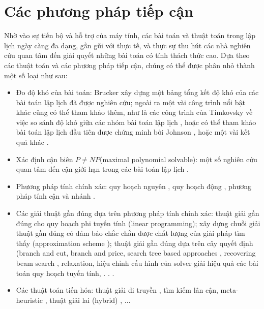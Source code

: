 \documentclass[11pt]{article}
\begin{document}
\section{\texorpdfstring{Các phương pháp tiếp cận}{Approaches}}

Nhờ vào sự tiến bộ và hỗ trợ của máy tính, các bài toán và thuật toán trong lập lịch ngày càng đa dạng, gần gũi với thực tế, và thực sự thu hút các nhà nghiên cứu quan tâm đến giải quyết những bài toán có tính thách thức cao.
Dựa theo các thuật toán và các phương pháp tiếp cận, chúng có thể được phân nhỏ thành một số loại như sau:

\begin{itemize}
\item Đo độ khó của bài toán: Brucker \cite{Brucker:2004,Brucker:Knust:2004} xây dựng một bảng tổng kết độ khó của các bài toán lập lịch đã được nghiên cứu; ngoài ra một vài công trình nổi bật khác cũng có thể tham khảo thêm, như là các công trình của Timkovsky về việc so sánh độ khó giữa các nhóm bài toán lập lịch \cite{Timkovsky:1998,Timkovsky:2003}, hoặc có thể tham khảo bài toán lập lịch đầu tiên được chứng minh bởi Johnson \cite{Johnson:1954}, hoặc một vài kết quả khác \cite{Haned:al:2012, Soukhal:al:2005}.

\item Xác định cận biên $P \neq NP$(maximal polynomial solvable): một số nghiên cứu quan tâm đến cận giới hạn trong các bài toán lập lịch  \cite{Baptiste:2000, Baptiste:al:2004, Baptiste:al:2007, Brucker:2004, HuynhTuong:Soukhal:2008}.

\item Phương pháp tính chính xác: quy hoạch nguyên \cite{Baptiste:Sadykov:2010, LeThi:Pham:2008}, quy hoạch động \cite{HuynhTuong:al:2010, Lawler:1969, Lawler:1990}, phương pháp tính cận và nhánh \cite{BellenguezMorineau:Neron:2007, Carlier:1982, Woeginger:2008}.

\item Các giải thuật gần đúng dựa trên phương pháp tính chính xác: thuật giải gần đúng cho quy hoạch phi tuyến tính (linear programming)\cite{Hoang:2009a, Hoang:2009b, LeThi:Pham:2008}; xây dựng chuỗi giải thuật gần đúng có đảm bảo chắc chắn được chất lượng của giải pháp tìm thấy (approximation scheme \cite{Afrati:Milis:2006, Kellerer:Strusevich:2006, Kolliopoulos:Steiner:2006, Kovalyov:1995}); thuật giải gần đúng dựa trên cây quyết định (branch and cut, branch and price, search tree based approaches \cite{Neron:al:2008, Woeginger:2008}, recovering beam search \cite{DellaCroce:al:2011, Rakrouki:al:2012}, relaxation, hiệu chỉnh cấu hình của solver giải hiệu quả các bài toán quy hoạch tuyến tính, . . . 

\item Các thuật toán tiến hóa: thuật giải di truyền \cite{Holland:1975, Soukhal:al:2005}, tìm kiếm lân cận, meta-heuristic \cite{Kergosien:al:2011a}, thuật giải lai (hybrid) \cite{Rakrouki:al:2012}, $\ldots$
\end{itemize}
\end{document}
